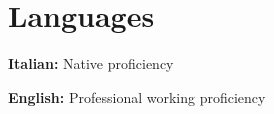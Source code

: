 
\section{Languages}

\begin{onecolentry}
    \textbf{Italian:} Native proficiency
\end{onecolentry}

\vspace{0.2 cm} %

\begin{onecolentry}
    \textbf{English:} Professional working proficiency
\end{onecolentry}

